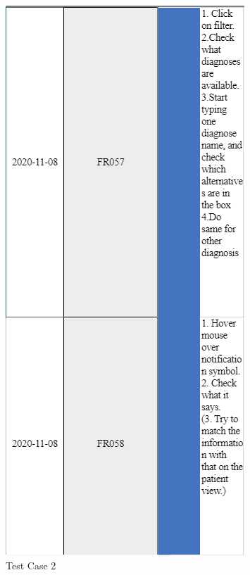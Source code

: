 \begin{figure}[ht!]
\begin{minipage}[t]{0.5\textwidth}
    \centering
    \includegraphics[scale=0.75]{Pictures/TestCase2.PNG}
    \caption{Test Case 2}
\end{minipage}
\end{figure}

